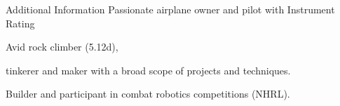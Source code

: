 \begin{rubric}{Additional Information}
\entry*[Interests]%
Passionate airplane owner and pilot with Instrument Rating

Avid rock climber (5.12d), 

tinkerer and maker with a broad scope of projects and techniques. 

Builder and participant in combat robotics competitions (NHRL).
\end{rubric}
